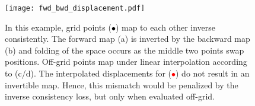 %       
%       
%       
%       


\begin{figure}
  \centering
  \texttt{[image: fwd\_bwd\_displacement.pdf]}
  \caption{\label{fig:off_grid_resampling}In this example, grid points (\textcolor{black}{$\bullet$}) map to each other inverse consistently. The forward map (a) is inverted by the backward map (b) and folding of the space occurs as the middle two points swap positions. Off-grid points map under linear interpolation according to (c/d). The interpolated displacements for (\textcolor{red}{$\bullet$}) do not result in an invertible map. Hence, this mismatch would be penalized by the inverse consistency loss, but only when evaluated off-grid.}
  \vspace{-0.2cm}
\end{figure}


